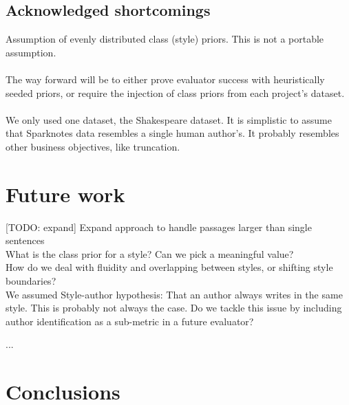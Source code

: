 \documentclass[letterpaper, 10 pt, conference]{ieeeconf}  %
\begin{document}
  \subsection{Acknowledged shortcomings}
  Assumption of evenly distributed class (style) priors. This is not a portable assumption. \\ \\The way forward will be to either prove evaluator success with heuristically seeded priors, or require the injection of class priors from each project's dataset. \\ \\
We only used one dataset, the Shakespeare dataset. It is simplistic to assume that Sparknotes data resembles a single human author's. It probably resembles other business objectives, like truncation.

\section{Future work}
[TODO: expand]
Expand approach to handle passages larger than single sentences\\
What is the class prior for a style? Can we pick a meaningful value?\\

How do we deal with fluidity and overlapping between styles, or shifting style boundaries?\\

We assumed Style-author hypothesis: That an author always writes in the same style. This is probably not always the case. Do we tackle this issue by including author identification as a sub-metric in a future evaluator?


...
\section{Conclusions}



\addtolength{\textheight}{-12cm}   %
\end{document}

